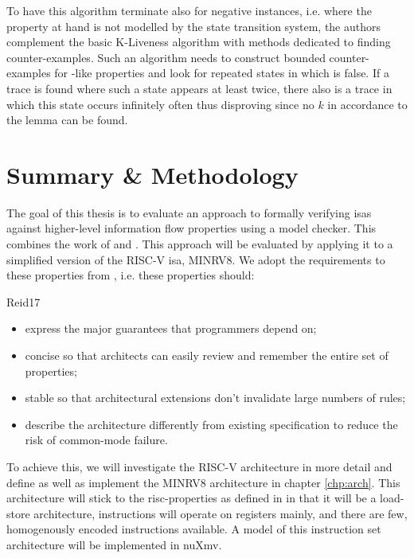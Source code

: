 To have this algorithm terminate also for negative instances, i.e. where the property at hand is not modelled by the state transition system, the authors complement the basic K-Liveness algorithm with methods dedicated to finding counter-examples.
Such an algorithm needs to construct bounded counter-examples for -like properties and look for repeated states in which  is false.
If a trace is found where such a state appears at least twice, there also is a trace in which this state occurs infinitely often thus disproving  since no $ k $ in accordance to the lemma can be found.

\section{Summary \& Methodology}
\label{sec:sum-background}

The goal of this thesis is to evaluate an approach to formally verifying \glspl{isa} against higher-level information flow properties using a model checker.
This combines the work of \citeauthor{Reid17} \cite{Reid17} and \citeauthor{Ferraiuolo17} \cite{Ferraiuolo17}.
This approach will be evaluated by applying it to a simplified version of the RISC-V \gls{isa}, MINRV8.
We adopt the requirements to these properties from \cite{Reid17}, i.e. these properties should:
\begin{displaycquote}[pp.88:2-3]{Reid17}
    \begin{itemize}
        \item express the major guarantees that programmers depend on;
        \item {} concise so that architects can easily review and remember the entire set of properties;
        \item {} stable so that architectural extensions don't invalidate large numbers of rules;
        \item \textelp{} describe the architecture differently from existing specification to reduce the risk of common-mode failure.
    \end{itemize}
\end{displaycquote}

To achieve this, we will investigate the RISC-V architecture in more detail and define as well as implement the MINRV8 architecture in chapter \ref{chp:arch}.
This architecture will stick to the \gls{risc}-properties as defined in \cite{Hennessy12} in that it will be a load-store architecture, instructions will operate on registers mainly, and there are few, homogenously encoded instructions available.
A model of this instruction set architecture will be implemented in nuXmv.

